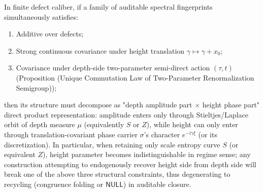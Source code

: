 



\begin{proposition}
In finite defect caliber, if a family of auditable spectral fingerprints simultaneously satisfies:
\begin{enumerate}
  \item Additive over defects;
  \item Strong continuous covariance under height translation \(\gamma\mapsto\gamma+x_0\);
  \item Covariance under depth-side two-parameter semi-direct action \((\tau,t)\) (Proposition (Unique Commutation Law of Two-Parameter Renormalization Semigroup));
\end{enumerate}
then its structure must decompose as "depth amplitude part \(\times\) height phase part" direct product representation: amplitude enters only through Stieltjes/Laplace orbit of depth measure \(\mu\) (equivalently \(S\) or \(Z\)), while height can only enter through translation-covariant phase carrier \(\sigma\)'s character \(e^{-\mathrm{i}\gamma\xi}\) (or its discretization).
In particular, when retaining only scale entropy curve \(S\) (or equivalent \(Z\)), height parameter becomes indistinguishable in regime sense; any construction attempting to endogenously recover height side from depth side will break one of the above three structural constraints, thus degenerating to recycling (congruence folding or \(\mathsf{NULL}\)) in auditable closure.
\end{proposition}

\endinput
